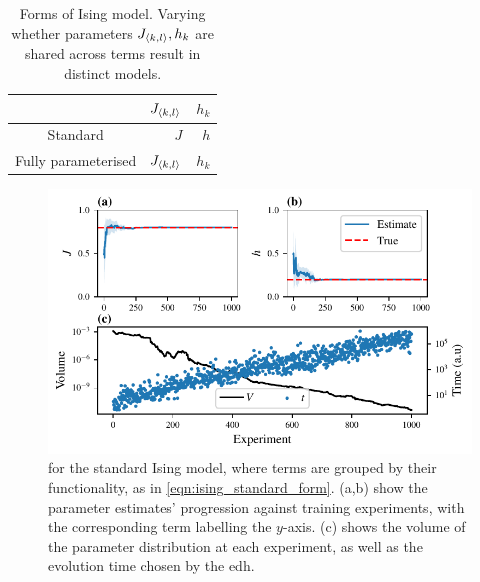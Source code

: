 \begin{table}[H]
    \begin{center}
        \begin{tabular}{crr}
             & $J_{{ \langle k, l \rangle }}$  & $h_{k}$ \\
            \hline
            Standard & $J$ & $h$ \\
            Fully parameterised & $J_{{ \langle k, l \rangle }}$ & $h_{k}$
        \end{tabular}
    \end{center}
    \caption[Forms of Ising model]{Forms of Ising model. Varying whether parameters $J_{{ \langle k, l \rangle }}, h_k$ are shared 
        across terms result in distinct models. 
    }
    \label{table:ising_models}
\end{table}

\par 

\begin{figure}[t]
    \begin{center}
        \includegraphics{theoretical_study/figures/standard_ising_qhl.pdf}
    \end{center}

    \caption[ for the standard Ising model]{
         for the standard Ising model, where terms are grouped by their functionality, 
        as in \cref{eqn:ising_standard_form}. 
        (a,b) show the parameter estimates' progression against training experiments, 
            with the corresponding term labelling the $y$-axis. 
        (c) shows the \gls{volume} of the parameter distribution at each experiment, 
            as well as the evolution time chosen by the \gls{edh}. 
        \figtableref
    }
    \label{fig:ising_two_param_learning}
\end{figure}


